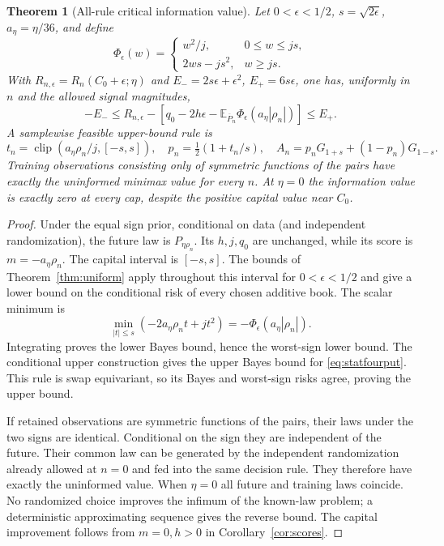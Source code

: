 \documentclass[11pt,a4paper]{amsart}
\theoremstyle{plain}
\newtheorem{theorem}{Theorem}[section]
\theoremstyle{definition}
\theoremstyle{remark}
\newcommand{\EE}{\mathbb{E}}
\DeclareMathOperator{\clip}{clip}
\newcommand{\Ebar}{\EE_{\overline P_n}}
\begin{document}
\begin{theorem}[All-rule critical information value]\label{thm:criticalstat}
Let $0<\epsilon<1/2$, $s=\sqrt{2\epsilon}$, $a_\eta=\eta/36$, and define
\[
 \Phi_\epsilon(w)=
 \begin{cases}
 w^2/j,&0\le w\le js,\\
 2ws-js^2,&w\ge js.
 \end{cases}
\]
With $R_{n,\epsilon}=R_n(C_0+\epsilon;\eta)$ and
$E_-=2s\epsilon+\epsilon^2$, $E_+=6s\epsilon$, one has, uniformly in $n$ and the allowed signal magnitudes,
\begin{equation}\label{eq:criticalstatbounds}
 -E_-\le R_{n,\epsilon}
 -\left[q_0-2h\epsilon-\Ebar\Phi_\epsilon(a_\eta|\rho_n|)\right]\le E_+.
\end{equation}
A samplewise feasible upper-bound rule is
\begin{equation}\label{eq:statfourput}
 t_n=\clip(a_\eta\rho_n/j,[-s,s]),\quad p_n=\tfrac12(1+t_n/s),\quad
 A_n=p_nG_{1+s}+(1-p_n)G_{1-s}.
\end{equation}
Training observations consisting only of symmetric functions of the pairs have exactly the uninformed minimax value for every $n$. At $\eta=0$ the information value is exactly zero at every cap, despite the positive capital value near $C_0$.
\end{theorem}
\begin{proof}
Under the equal sign prior, conditional on data (and independent randomization), the future law is $P_{\eta\rho_n}$. Its $h,j,q_0$ are unchanged, while its score is $m=-a_\eta\rho_n$. The capital interval is $[-s,s]$. The bounds of Theorem~\ref{thm:uniform} apply throughout this interval for $0<\epsilon<1/2$ and give a lower bound on the conditional risk of every chosen additive book. The scalar minimum is
\[
 \min_{|t|\le s}(-2a_\eta\rho_nt+jt^2)
 =-\Phi_\epsilon(a_\eta|\rho_n|).
\]
Integrating proves the lower Bayes bound, hence the worst-sign lower bound. The conditional upper construction gives the upper Bayes bound for \eqref{eq:statfourput}. This rule is swap equivariant, so its Bayes and worst-sign risks agree, proving the upper bound.

If retained observations are symmetric functions of the pairs, their laws under the two signs are identical. Conditional on the sign they are independent of the future. Their common law can be generated by the independent randomization already allowed at $n=0$ and fed into the same decision rule. They therefore have exactly the uninformed value. When $\eta=0$ all future and training laws coincide. No randomized choice improves the infimum of the known-law problem; a deterministic approximating sequence gives the reverse bound. The capital improvement follows from $m=0,h>0$ in Corollary~\ref{cor:scores}.
\end{proof}
\end{document}
